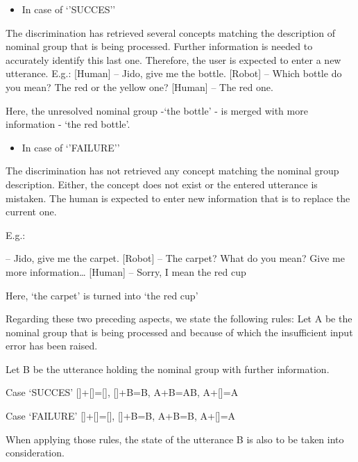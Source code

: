 \documentclass[twoside,a4paper,10pt]{report}
\newcommand{\dokuitem}{\item}
\begin{document}
\begin{itemize}
\dokuitem  In case of ‘’SUCCES’’
\end{itemize}
The discrimination has retrieved several concepts matching the description of nominal group that is being processed. Further information is needed to accurately identify this last one. Therefore, the user is expected to enter a new utterance.
E.g.: 
[Human] – Jido, give me the bottle.
[Robot] – Which bottle do you mean? The red or the yellow one?
[Human] – The red one. 

Here, the unresolved nominal group -‘the bottle’ - is merged with more information - ‘the red bottle’.



\begin{itemize}
\dokuitem  In case of ‘’FAILURE’’
\end{itemize}
The discrimination has not retrieved any concept matching the nominal group description. Either, the concept does not exist or the entered utterance is mistaken. The human is expected to enter new information that is to replace the current one.

E.g.:


\small
\begin{verbatimtab}
  [Human] – Jido, give me the carpet.
  [Robot] – The carpet? What do you mean? Give me more information…
  [Human] – Sorry, I mean the red cup
\end{verbatimtab}
\normalsize

Here, ‘the carpet’ is turned into ‘the red cup’

Regarding these two preceding aspects, we state the following rules:
Let A be the nominal group that is being processed and because of which the insufficient input error has been raised.

Let B be the utterance holding the nominal group with further information.


\small
\begin{verbatimtab}
  Case ‘SUCCES’ {
  []+[]=[], 
  []+B=B, 
  A+B=AB, 
  A+[]=A
      }
\end{verbatimtab}
\normalsize

\small
\begin{verbatimtab}
  Case ‘FAILURE’ {
  []+[]=[], 
  []+B=B, 
  A+B=B,  
  A+[]=A
      }
\end{verbatimtab}
\normalsize

When applying those rules, the state of the utterance B is also to be taken into consideration.
\end{document}
